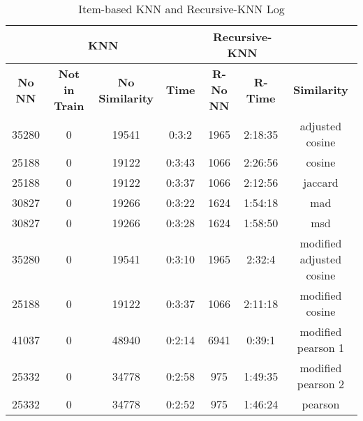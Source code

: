 \begin{table}[H]
\centering
\caption{Item-based KNN and Recursive-KNN Log}
\label{table:items_log}
\begin{tabular}{|c|c|c|c|c|c|c}
\cline{1-6}
\multicolumn{4}{|c|}{\textbf{KNN}}                                               & \multicolumn{2}{c|}{\textbf{Recursive-KNN}} & \multicolumn{1}{l}{}                          \\ \hline
\textbf{No NN} & \textbf{Not in  Train} & \textbf{No Similarity} & \textbf{Time} & \textbf{R-No NN}      & \textbf{R-Time}     & \multicolumn{1}{c|}{\textbf{Similarity}}      \\ \hline
35280          & 0                      & 19541                  & 0:3:2         & 1965                  & 2:18:35             & \multicolumn{1}{c|}{adjusted cosine}          \\ \hline
25188          & 0                      & 19122                  & 0:3:43        & 1066                  & 2:26:56             & \multicolumn{1}{c|}{cosine}                   \\ \hline
25188          & 0                      & 19122                  & 0:3:37        & 1066                  & 2:12:56             & \multicolumn{1}{c|}{jaccard}                  \\ \hline
30827          & 0                      & 19266                  & 0:3:22        & 1624                  & 1:54:18             & \multicolumn{1}{c|}{mad}                      \\ \hline
30827          & 0                      & 19266                  & 0:3:28        & 1624                  & 1:58:50             & \multicolumn{1}{c|}{msd}                      \\ \hline
35280          & 0                      & 19541                  & 0:3:10        & 1965                  & 2:32:4              & \multicolumn{1}{c|}{modified adjusted cosine} \\ \hline
25188          & 0                      & 19122                  & 0:3:37        & 1066                  & 2:11:18             & \multicolumn{1}{c|}{modified cosine}          \\ \hline
41037          & 0                      & 48940                  & 0:2:14        & 6941                  & 0:39:1              & \multicolumn{1}{c|}{modified pearson 1}       \\ \hline
25332          & 0                      & 34778                  & 0:2:58        & 975                   & 1:49:35             & \multicolumn{1}{c|}{modified pearson 2}       \\ \hline
25332          & 0                      & 34778                  & 0:2:52        & 975                   & 1:46:24             & \multicolumn{1}{c|}{pearson}                  \\ \hline
\end{tabular}
\end{table}
